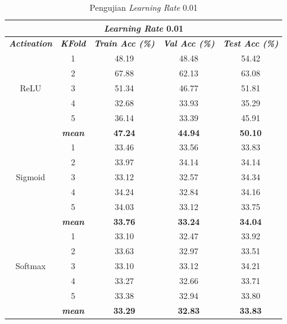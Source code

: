         \begin{table}[H]
        \centering
        \caption{Pengujian \textit{Learning Rate} 0.01 }
        \begin{tabular}{ccccc}
            \toprule
            \multicolumn{5}{c}{\textit{Learning Rate} 0.01} \\ \hline
            
            \textbf{\textit{Activation}} & \multicolumn{1}{c}{\textbf{\textit{KFold}}} & \textbf{\textit{Train Acc (\%)} } & \textbf{\textit{Val Acc (\%)}} & \textbf{\textit{Test Acc (\%)}}  \\
    
            \midrule
            \multirow{5}{*}{ReLU} 
            & 1 & 48.19 & 48.48 & 54.42  \\
            & 2 & 67.88 & 62.13 & 63.08 \\
            & 3 & 51.34 & 46.77 & 51.81 \\
            & 4 & 32.68 & 33.93 & 35.29 \\
            & 5 & 36.14 & 33.39 & 45.91 \\ 
            & \textbf{\textit{mean}}& \textbf{47.24 }& \textbf{44.94} & \textbf{50.10} \\ \hline

    
            \multirow{5}{*}{Sigmoid}
            & 1 & 33.46 & 33.56 & 33.83  \\
            & 2 & 33.97 & 34.14 & 34.14 \\
            & 3 & 33.12 & 32.57 & 34.34 \\
            & 4 & 34.24 & 32.84 & 34.16 \\
            & 5 & 34.03 & 33.12 & 33.75 \\
            & \textit{\textbf{mean}}& \textbf{33.76} & \textbf{33.24} &\textbf{34.04} \\ 
                        \hline
    
            \multirow{5}{*}{Softmax}
            & 1 & 33.10 & 32.47 & 33.92 \\
            & 2 & 33.63 & 32.97 & 33.51 \\
            & 3 & 33.10 & 33.12 & 34.21  \\
            & 4 & 33.27 & 32.66 & 33.71 \\
            & 5 & 33.38 & 32.94 & 33.80 \\
            & \textit{\textbf{mean}}& \textbf{33.29} & \textbf{32.83} &\textbf{33.83} \\ 
    

            \bottomrule
            \end{tabular}
            \label{Pengujian Learning Rate 0.01 }
        \end{table}

